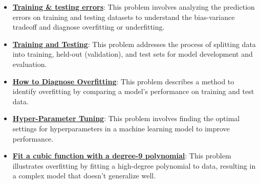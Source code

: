 \documentclass{article}%
\begin{document}
\begin{itemize}[leftmargin=*]
\item \href{https://purdue.brightspace.com/d2l/common/assets/pdfjs-d2l-dist/1.0.14-legacy/web/viewer.html?file=\%2Fcontent\%2Fenforced\%2F1095467-wl.202510.CS.24300.001\%2F10L1-CrossValidation.pdf\%3Fou\%3D1095467\&lang=en-us\&container=d2l-fileviewer-rendered-pdf\&fullscreen=d2l-fileviewer-rendered-pdf-dialog\&height=667#page=4}{\textbf{Training \& testing errors}}: This problem involves analyzing the prediction errors on training and testing datasets to understand the bias-variance tradeoff and diagnose overfitting or underfitting.%
\item \href{https://purdue.brightspace.com/d2l/common/assets/pdfjs-d2l-dist/1.0.14-legacy/web/viewer.html?file=\%2Fcontent\%2Fenforced\%2F1095467-wl.202510.CS.24300.001\%2F10L1-CrossValidation.pdf\%3Fou\%3D1095467\&lang=en-us\&container=d2l-fileviewer-rendered-pdf\&fullscreen=d2l-fileviewer-rendered-pdf-dialog\&height=667#page=5}{\textbf{Training and Testing}}: This problem addresses the process of splitting data into training, held-out (validation), and test sets for model development and evaluation.%
\item \href{https://purdue.brightspace.com/d2l/common/assets/pdfjs-d2l-dist/1.0.14-legacy/web/viewer.html?file=\%2Fcontent\%2Fenforced\%2F1095467-wl.202510.CS.24300.001\%2F10L1-CrossValidation.pdf\%3Fou\%3D1095467\&lang=en-us\&container=d2l-fileviewer-rendered-pdf\&fullscreen=d2l-fileviewer-rendered-pdf-dialog\&height=667#page=12}{\textbf{How to Diagnose Overfitting}}: This problem describes a method to identify overfitting by comparing a model's performance on training and test data.%
\item \href{https://purdue.brightspace.com/d2l/common/assets/pdfjs-d2l-dist/1.0.14-legacy/web/viewer.html?file=\%2Fcontent\%2Fenforced\%2F1095467-wl.202510.CS.24300.001\%2F10L1-CrossValidation.pdf\%3Fou\%3D1095467\&lang=en-us\&container=d2l-fileviewer-rendered-pdf\&fullscreen=d2l-fileviewer-rendered-pdf-dialog\&height=667#page=14}{\textbf{Hyper-Parameter Tuning}}: This problem involves finding the optimal settings for hyperparameters in a machine learning model to improve performance.%
\item \href{https://purdue.brightspace.com/d2l/common/assets/pdfjs-d2l-dist/1.0.14-legacy/web/viewer.html?file=\%2Fcontent\%2Fenforced\%2F1095467-wl.202510.CS.24300.001\%2F10L1-CrossValidation.pdf\%3Fou\%3D1095467\&lang=en-us\&container=d2l-fileviewer-rendered-pdf\&fullscreen=d2l-fileviewer-rendered-pdf-dialog\&height=667#page=15}{\textbf{Fit a cubic function with a degree-9 polynomial}}: This problem illustrates overfitting by fitting a high-degree polynomial to data, resulting in a complex model that doesn't generalize well.%

\end{itemize}
\end{document}
